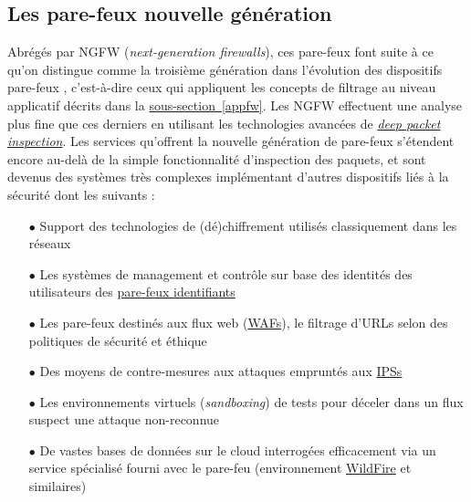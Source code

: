 \documentclass[]{article}
\begin{document}
\subsection{Les pare-feux nouvelle génération}

Abrégés par NGFW (\textit{next-generation firewalls}), ces pare-feux font suite à ce qu'on distingue comme la troisième génération dans l'évolution des dispositifs pare-feux \cite{wikifw}, c'est-à-dire ceux qui appliquent les concepts de filtrage au niveau applicatif décrits dans la \hyperref[appfw]{sous-section~\ref{appfw}}. Les NGFW effectuent une analyse plus fine que ces derniers en utilisant les technologies avancées de \href{https://en.wikipedia.org/wiki/Deep\_packet\_inspection}{\textit{deep packet inspection}}. Les services qu'offrent la nouvelle génération de pare-feux s'étendent encore au-delà de la simple fonctionnalité d'inspection des paquets, et sont devenus des systèmes très complexes implémentant d'autres dispositifs liés à la sécurité dont les suivants :
\vspace{0.2cm}
\begin{itemize}
\item[$\bullet$] Support des technologies de (dé)chiffrement utilisés classiquement dans les réseaux
\vspace{0.2cm}
\item[$\bullet$] Les systèmes de management et contrôle sur base des identités des utilisateurs des \hyperref[idfw]{pare-feux identifiants} 
\vspace{0.2cm}
\item[$\bullet$] Les pare-feux destinés aux flux web (\hyperref[waf]{WAFs}), le filtrage d'URLs selon des politiques de sécurité et éthique
\vspace{0.2cm}
\item[$\bullet$] Des moyens de contre-mesures aux attaques empruntés aux \hyperref[IPS]{IPSs}
\vspace{0.2cm}
\item[$\bullet$] Les environnements virtuels (\textit{sandboxing}) de tests pour déceler dans un flux suspect une attaque non-reconnue \cite{Kokko2017}
\vspace{0.2cm}
\item[$\bullet$] De vastes bases de données sur le cloud interrogées efficacement via un service spécialisé fourni avec le pare-feu (environnement \href{https://www.paloaltonetworks.com/documentation/80/wildfire/wf\_admin/wildfire-overview/wildfire-deployments/wildfire-global-cloud}{WildFire} et similaires)
\end{itemize}
\end{document}
